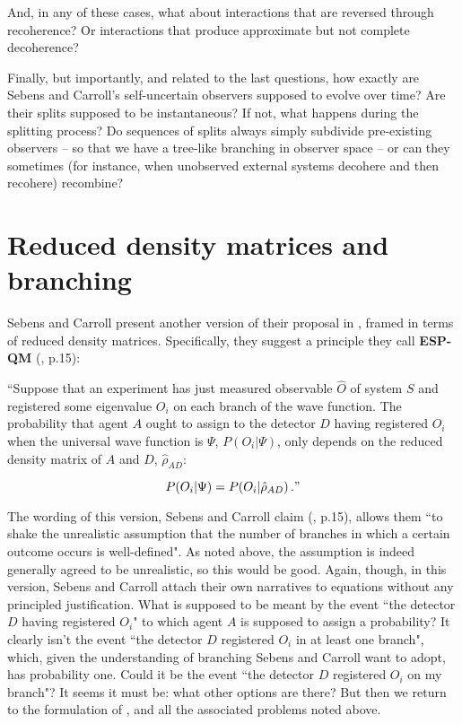 \documentclass[aps,prl]{revtex4}
\begin{document}
And, in any of these cases, what about interactions that are
reversed through recoherence?   Or interactions
that produce approximate but not complete decoherence?  

Finally, but importantly, and related to the last questions,
how exactly are Sebens and Carroll's
self-uncertain observers supposed to evolve over time?   
Are their splits supposed to be instantaneous?   If not,
what happens during the splitting process?   Do sequences
of splits always simply subdivide pre-existing observers --
so that we have a tree-like branching in observer space --
or can they sometimes (for instance, when unobserved external
systems decohere and then recohere) recombine?   


\section{Reduced density matrices and branching}

Sebens and Carroll present another version of their proposal
in \cite{cs1}, framed in terms of reduced density matrices.
Specifically, they suggest a principle they call {\bf ESP-QM}
(\cite{cs1}, p.15):

``Suppose that an experiment has just measured observable
$\hat{O}$ of system $S$ and registered some eigenvalue
$O_i$ on each branch of the wave function.  The probability
that agent $A$ ought to assign to the detector $D$ having
registered $O_i$ when the universal wave function is
$\Psi$, $P ( O_i | \Psi )$, only depends on the reduced density
matrix of $A$ and $D$, $\hat{\rho}_{AD}$:

\begin{equation}
P( O_i | \Psi ) = P( O_i | \hat{\rho}_{AD} ) \, ." 
\end{equation}

The wording of this version, Sebens and Carroll claim (\cite{cs1},
p.15), allows them ``to shake the unrealistic assumption that the number
of branches in which a certain outcome occurs is well-defined". 
As noted above, the assumption is indeed generally agreed to be 
unrealistic, so this would be good.    Again, though, in this
version, Sebens and Carroll attach their own narratives 
to equations without any principled justification. 
What is supposed to be meant by
the event ``the detector $D$ having registered $O_i$" to
which agent $A$ is supposed to assign a probability? 
It clearly isn't the event ``the detector $D$ registered $O_i$ in
at least one branch", which, given the understanding of branching 
Sebens and Carroll want to adopt, has probability one.  
Could it be the event ``the detector $D$ registered $O_i$ on
my branch"?  It seems it must be: what other options are
there?   But then we return to the formulation of 
\cite{cs2}, and all the associated problems noted above.  
\end{document}
